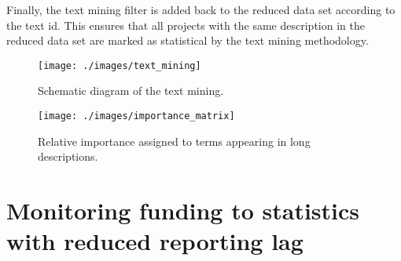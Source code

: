 \documentclass[
]{article}
\newenvironment{Shaded}{\begin{snugshade}}{\end{snugshade}}
\newcommand{\AttributeTok}[1]{\textcolor[rgb]{0.77,0.63,0.00}{#1}}
\newcommand{\CommentTok}[1]{\textcolor[rgb]{0.56,0.35,0.01}{\textit{#1}}}
\newcommand{\ConstantTok}[1]{\textcolor[rgb]{0.00,0.00,0.00}{#1}}
\newcommand{\FunctionTok}[1]{\textcolor[rgb]{0.00,0.00,0.00}{#1}}
\newcommand{\NormalTok}[1]{#1}
\newcommand{\OtherTok}[1]{\textcolor[rgb]{0.56,0.35,0.01}{#1}}
\newcommand{\SpecialCharTok}[1]{\textcolor[rgb]{0.00,0.00,0.00}{#1}}
\begin{document}
\begin{enumerate}
\begin{enumerate}
\begin{Shaded}
\end{Shaded}
  \end{enumerate}
\end{enumerate}

Finally, the text mining filter is added back to the reduced data set according to the text id. This ensures that all projects with the same description in the reduced data set are marked as statistical by the text mining methodology.

\begin{figure}

{\centering \texttt{[image: ./images/text\_mining]} 

}

\caption{Schematic diagram of the text mining.}\label{fig:text-mining}
\end{figure}

\begin{figure}[!H]

{\centering \texttt{[image: ./images/importance\_matrix]} 

}

\caption{Relative importance assigned to terms appearing in long descriptions.}\label{fig:importance-matrix}
\end{figure}

\hypertarget{monitoring-funding-to-statistics-with-reduced-reporting-lag}{%
\section{Monitoring funding to statistics with reduced reporting lag}\label{monitoring-funding-to-statistics-with-reduced-reporting-lag}}
\end{document}
